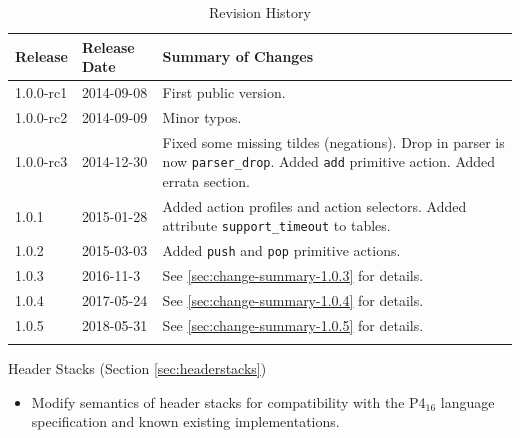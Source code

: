 \documentclass[12pt]{article}
\begin{document}
\begin{table}[H]
\begin{center}
\begin{tabular}{| l | l | p{} |} \hline
\textbf{Release} &
\textbf{Release Date} &
\textbf{Summary of Changes} \\  \hline
1.0.0-rc1 & 2014-09-08 & First public version. \\  \hline
1.0.0-rc2 & 2014-09-09 & Minor typos. \\  \hline
1.0.0-rc3 & 2014-12-30 & Fixed some missing tildes (negations). Drop in parser is now \texttt{parser_drop}. Added \texttt{add} primitive action. Added errata section. \\  \hline
1.0.1 & 2015-01-28 & Added action profiles and action selectors. Added attribute \texttt{support_timeout} to tables. \\  \hline
1.0.2 & 2015-03-03 & Added \texttt{push} and \texttt{pop} primitive actions. \\  \hline
1.0.3 & 2016-11-3 & See \ref{sec:change-summary-1.0.3} for details. \\ \hline
1.0.4 & 2017-05-24 & See \ref{sec:change-summary-1.0.4} for details. \\ \hline
1.0.5 & 2018-05-31 & See \ref{sec:change-summary-1.0.5} for details. \\ \hline
}
\end{tabular}
\end{center}
\caption{Revision History}
\label{tab:revhistory}
\end{table}


\item Header Stacks (Section \ref{sec:headerstacks})
\begin{itemize}
\item Modify semantics of header stacks for compatibility with the P4$_16$ language specification and known existing implementations.
\end{itemize}
    
\end{document}
